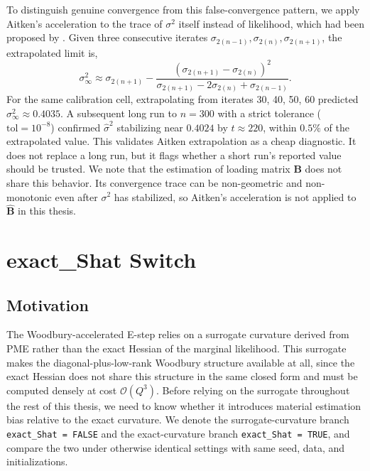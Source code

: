 To distinguish genuine convergence from this false-convergence pattern, we apply Aitken's acceleration to the trace of $\sigma^{2}$ itself instead of likelihood, which had been proposed by \citet{Louis1982}. Given three consecutive iterates $\sigma_{2(n-1)}, \sigma_{2(n)}, \sigma_{2(n+1)}$, the extrapolated limit is,
\begin{equation}
    \sigma^2_\infty \approx \sigma_{2(n+1)} - \frac{\left(\sigma_{2(n+1)} - \sigma_{2(n)}\right)^2}
{\sigma_{2(n+1)} - 2\sigma_{2(n)} + \sigma_{2(n-1)}}.
\end{equation}
For the same calibration cell, extrapolating from iterates 30, 40, 50, 60 predicted $\sigma^2_\infty \approx 0.4035$. A subsequent long run to $n=300$ with a strict tolerance ($\mathrm{tol}=10^{-8}$) confirmed $\hat\sigma^2$ stabilizing near $0.4024$ by $t \approx 220$, within $0.5\%$ of the extrapolated value. This validates Aitken extrapolation as a cheap diagnostic. It does not replace a long run, but it flags whether a short run's reported value should be trusted. We note that the estimation of loading matrix $\mathbf{B}$ does not share this behavior. Its convergence trace can be non-geometric and non-monotonic even after $\sigma^2$ has stabilized, so Aitken's acceleration is not applied to $\hat{\mathbf{B}}$ in this thesis. 

\section{exact\_Shat Switch}
\label{sec:sim-exact-shat}

\subsection{Motivation}

The Woodbury-accelerated E-step relies on a surrogate curvature derived from PME rather than the exact Hessian of the marginal likelihood. This surrogate makes the diagonal-plus-low-rank Woodbury structure available at all, since the exact Hessian does not share this structure in the same closed form and must be computed densely at cost $\mathcal{O}(Q^3)$. Before relying on the surrogate throughout the rest of this thesis, we need to know whether it introduces material estimation bias relative to the exact curvature. We denote the surrogate-curvature branch \texttt{exact\_Shat = FALSE} and the exact-curvature branch \texttt{exact\_Shat = TRUE}, and compare the two under otherwise identical settings with same seed, data, and initializations.

